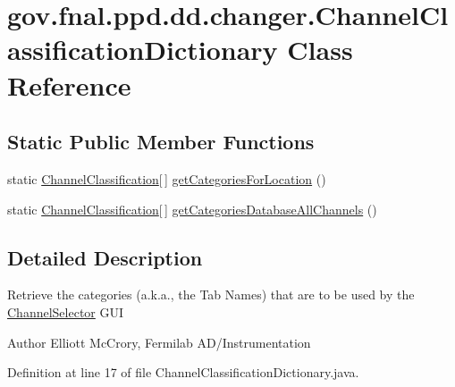 \hypertarget{classgov_1_1fnal_1_1ppd_1_1dd_1_1changer_1_1ChannelClassificationDictionary}{\section{gov.\-fnal.\-ppd.\-dd.\-changer.\-Channel\-Classification\-Dictionary Class Reference}
\label{classgov_1_1fnal_1_1ppd_1_1dd_1_1changer_1_1ChannelClassificationDictionary}
}
\subsection*{Static Public Member Functions}
\begin{DoxyCompactItemize}
\item 
static \hyperlink{classgov_1_1fnal_1_1ppd_1_1dd_1_1changer_1_1ChannelClassification}{Channel\-Classification}\mbox{[}$\,$\mbox{]} \hyperlink{classgov_1_1fnal_1_1ppd_1_1dd_1_1changer_1_1ChannelClassificationDictionary_a8a2e0f016baf28d44dbe7f9cee7703c1}{get\-Categories\-For\-Location} ()
\item 
static \hyperlink{classgov_1_1fnal_1_1ppd_1_1dd_1_1changer_1_1ChannelClassification}{Channel\-Classification}\mbox{[}$\,$\mbox{]} \hyperlink{classgov_1_1fnal_1_1ppd_1_1dd_1_1changer_1_1ChannelClassificationDictionary_a995477b1962da950f530115442788a7c}{get\-Categories\-Database\-All\-Channels} ()
\end{DoxyCompactItemize}


\subsection{Detailed Description}
Retrieve the categories (a.\-k.\-a., the Tab Names) that are to be used by the \hyperlink{classgov_1_1fnal_1_1ppd_1_1dd_1_1ChannelSelector}{Channel\-Selector} G\-U\-I

\begin{DoxyAuthor}{Author}
Elliott Mc\-Crory, Fermilab A\-D/\-Instrumentation 
\end{DoxyAuthor}


Definition at line 17 of file Channel\-Classification\-Dictionary.\-java.



